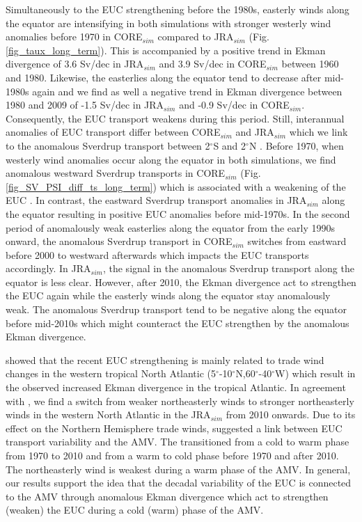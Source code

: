 \documentclass[os, manuscript]{copernicus}
\begin{document}
Simultaneously to the EUC strengthening before the 1980s, easterly winds along the equator are intensifying in both simulations with stronger westerly wind anomalies before 1970 in CORE$_{sim}$ compared to JRA$_{sim}$ (Fig. \ref{fig_taux_long_term}). This is accompanied by a positive trend in Ekman divergence of 3.6 Sv/dec in JRA$_{sim}$ and 3.9 Sv/dec in CORE$_{sim}$ between 1960 and 1980. Likewise, the easterlies along the equator tend to decrease after mid-1980s again and we find as well a negative trend in Ekman divergence between 1980 and 2009 of -1.5 Sv/dec in JRA$_{sim}$ and -0.9 Sv/dec in CORE$_{sim}$. Consequently, the EUC transport weakens during this period. Still, interannual anomalies of EUC transport differ between CORE$_{sim}$ and JRA$_{sim}$ which we link to the anomalous Sverdrup transport between 2$^{\circ}$S and 2$^{\circ}$N \citep{Arhan2006}. Before 1970, when westerly wind anomalies occur along the equator in both simulations, we find anomalous westward Sverdrup transports in CORE$_{sim}$ (Fig. \ref{fig_SV_PSI_diff_ts_long_term}) which is associated with a weakening of the EUC \citep{Kessler2003a,Arhan2006,Brandt2014}. In contrast, the eastward Sverdrup transport anomalies in JRA$_{sim}$ along the equator resulting in positive EUC anomalies before mid-1970s. In the second period of anomalously weak easterlies along the equator from the early 1990s onward, the anomalous Sverdrup transport in CORE$_{sim}$ switches from eastward before 2000 to westward afterwards which impacts the EUC transports accordingly. In JRA$_{sim}$, the signal in the anomalous Sverdrup transport along the equator is less clear. However, after 2010, the Ekman divergence act to strengthen the EUC again while the easterly winds along the equator stay anomalously weak. The anomalous Sverdrup transport tend to be negative along the equator before mid-2010s which might counteract the EUC strengthen by the anomalous Ekman divergence.  

\citet{Brandt2021a} showed that the recent EUC strengthening is mainly related to trade wind changes in the western tropical North Atlantic (5$^{\circ}$-10$^{\circ}$N,60$^{\circ}$-40$^{\circ}$W) which result in the observed increased Ekman divergence in the tropical Atlantic. In agreement with \citet{Brandt2021a}, we find a switch from weaker northeasterly winds to stronger northeasterly winds in the western North Atlantic in the JRA$_{sim}$ from 2010 onwards. Due to its effect on the Northern Hemisphere trade winds, \cite{Brandt2021a} suggested a link between EUC transport variability and the AMV. The  transitioned from a cold to warm phase from 1970 to 2010 and from a warm to cold phase before 1970 and after 2010. The northeasterly wind is weakest during a warm phase of the AMV. In general, our results support the idea that the decadal variability of the EUC is connected to the AMV through anomalous Ekman divergence which act to strengthen (weaken) the EUC during a cold (warm) phase of the AMV.
\end{document}
